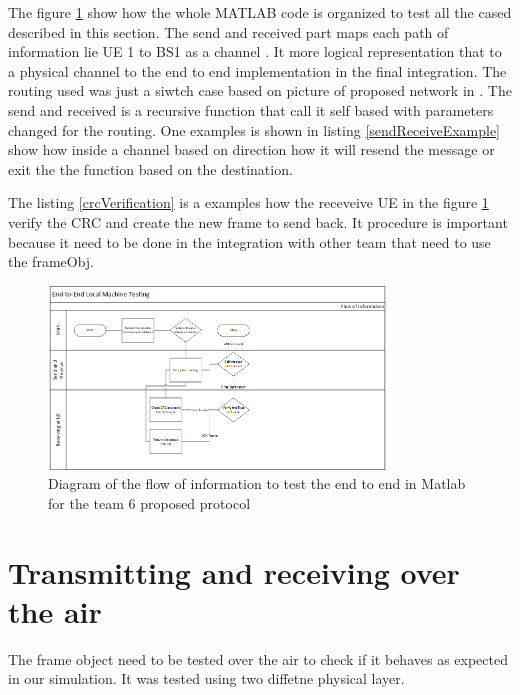 The figure \ref{fig:endendDiagram} show how the whole MATLAB code is organized to test all the cased described in this section.
The send and received part maps each path of information lie UE 1 to BS1 as a channel . It more logical representation that to a physical channel to the end
to end implementation in the final integration.
The routing used was just a siwtch case based on picture of proposed network in \cite{cdproj}.
The send and received is a recursive function that call it self based with parameters changed for the routing.
One examples is shown in listing \ref{sendReceiveExample} show how inside a channel based on direction how it will resend the message or exit the the function based on the destination.


The listing \ref{crcVerification} is a examples how the receveive UE in the figure \ref{fig:endendDiagram} verify the CRC and create the new frame to send back.
It procedure is important because it need to be done in the integration with other team that need to use the frameObj.     





\begin{figure}[ht]
    \centering
    \includegraphics[width=0.8\textwidth]{flowEndtoEnd.PNG}
    \caption{Diagram of the flow of information to test the end to end in Matlab for the team 6 proposed protocol}
    \label{fig:endendDiagram}
\end{figure} 

\section{Transmitting and receiving over the air}
The frame object need to be tested over the air to check if it behaves as expected in our simulation. 
It was tested using two diffetne physical layer. 
